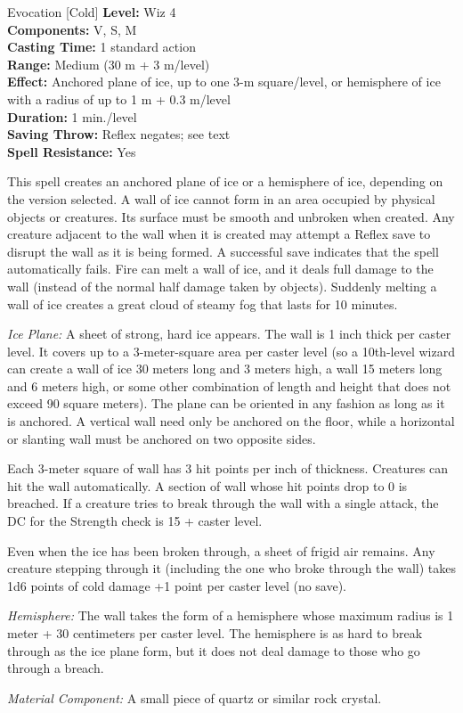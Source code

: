 {Evocation [Cold]}
{
	\textbf{Level:}
	Wiz 4\\
	\textbf{Components:}
	V, S, M\\
	\textbf{Casting Time:}
	1 standard action\\
	\textbf{Range:}
	Medium (30 m + 3 m/level)\\
	\textbf{Effect:}
	Anchored plane of ice, up to one 3-m square/level, or hemisphere of ice with a radius of up to 1 m + 0.3 m/level\\
	\textbf{Duration:}
	1 min./level\\
	\textbf{Saving Throw:}
	Reflex negates; see text\\
	\textbf{Spell Resistance:}
	Yes\\
}
{
	This spell creates an anchored plane of ice or a hemisphere of ice, depending on the version selected. A wall of ice cannot form in an area occupied by physical objects or creatures. Its surface must be smooth and unbroken when created. Any creature adjacent to the wall when it is created may attempt a Reflex save to disrupt the wall as it is being formed. A successful save indicates that the spell automatically fails. Fire can melt a wall of ice, and it deals full damage to the wall (instead of the normal half damage taken by objects). Suddenly melting a wall of ice creates a great cloud of steamy fog that lasts for 10 minutes.

	\textit{Ice Plane:}
	A sheet of strong, hard ice appears. The wall is 1 inch thick per caster level. It covers up to a 3-meter-square area per caster level (so a 10th-level wizard can create a wall of ice 30 meters long and 3 meters high, a wall 15 meters long and 6 meters high, or some other combination of length and height that does not exceed 90 square meters). The plane can be oriented in any fashion as long as it is anchored. A vertical wall need only be anchored on the floor, while a horizontal or slanting wall must be anchored on two opposite sides.

	Each 3-meter square of wall has 3 hit points per inch of thickness. Creatures can hit the wall automatically. A section of wall whose hit points drop to 0 is breached. If a creature tries to break through the wall with a single attack, the DC for the Strength check is 15 + caster level.

	Even when the ice has been broken through, a sheet of frigid air remains. Any creature stepping through it (including the one who broke through the wall) takes 1d6 points of cold damage +1 point per caster level (no save).

	\textit{Hemisphere:}
	The wall takes the form of a hemisphere whose maximum radius is 1 meter + 30 centimeters per caster level. The hemisphere is as hard to break through as the ice plane form, but it does not deal damage to those who go through a breach.

	\textit{Material Component:}
	A small piece of quartz or similar rock crystal.

}
